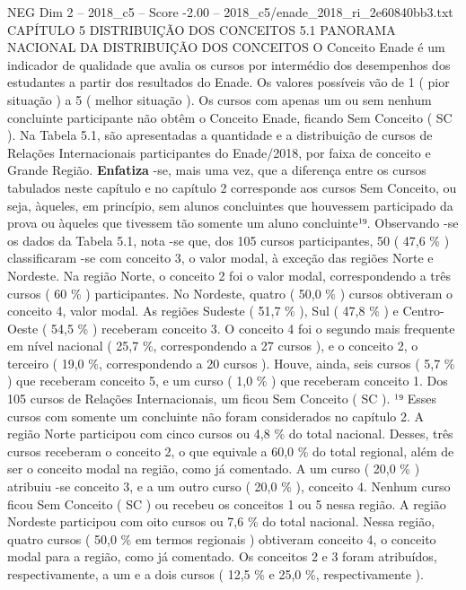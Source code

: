 \begin{textsample}{NEG Dim 2 – 2018\_c5 – Score -2.00 – 2018\_c5/enade\_2018\_ri\_2e60840bb3.txt}  \label{ex:f2_neg_118}
CAPÍTULO 5 DISTRIBUIÇÃO DOS CONCEITOS 5.1 PANORAMA NACIONAL DA DISTRIBUIÇÃO DOS CONCEITOS O Conceito Enade é um indicador de qualidade que avalia os cursos por intermédio dos desempenhos dos estudantes a partir dos resultados do Enade.
Os valores possíveis vão de 1 ( pior situação ) a 5 ( melhor situação ).
Os cursos com apenas um ou sem nenhum concluinte participante não obtêm o Conceito Enade, ficando Sem Conceito ( SC ).
Na Tabela 5.1, são apresentadas a quantidade e a distribuição de cursos de Relações Internacionais participantes do Enade/2018, por faixa de conceito e Grande Região. \textbf{Enfatiza} -se, mais uma vez, que a diferença entre os cursos tabulados neste capítulo e no capítulo 2 corresponde aos cursos Sem Conceito, ou seja, àqueles, em princípio, sem alunos concluintes que houvessem participado da prova ou àqueles que tivessem tão somente um aluno concluinte¹⁹.
Observando -se os dados da Tabela 5.1, nota -se que, dos 105 cursos participantes, 50 ( 47,6 \% ) classificaram -se com conceito 3, o valor modal, à exceção das regiões Norte e Nordeste.
Na região Norte, o conceito 2 foi o valor modal, correspondendo a três cursos ( 60 \% ) participantes.
No Nordeste, quatro ( 50,0 \% ) cursos obtiveram o conceito 4, valor modal.
As regiões Sudeste ( 51,7 \% ), Sul ( 47,8 \% ) e Centro-Oeste ( 54,5 \% ) receberam conceito 3.
O conceito 4 foi o segundo mais frequente em nível nacional ( 25,7 \%, correspondendo a 27 cursos ), e o conceito 2, o terceiro ( 19,0 \%, correspondendo a 20 cursos ).
Houve, ainda, seis cursos ( 5,7 \% ) que receberam conceito 5, e um curso ( 1,0 \% ) que receberam conceito 1.
Dos 105 cursos de Relações Internacionais, um ficou Sem Conceito ( SC ). ¹⁹ Esses cursos com somente um concluinte não foram considerados no capítulo 2.
A região Norte participou com cinco cursos ou 4,8 \% do total nacional.
Desses, três cursos receberam o conceito 2, o que equivale a 60,0 \% do total regional, além de ser o conceito modal na região, como já comentado.
A um curso ( 20,0 \% ) atribuiu -se conceito 3, e a um outro curso ( 20,0 \% ), conceito 4.
Nenhum curso ficou Sem Conceito ( SC ) ou recebeu os conceitos 1 ou 5 nessa região.
A região Nordeste participou com oito cursos ou 7,6 \% do total nacional.
Nessa região, quatro cursos ( 50,0 \% em termos regionais ) obtiveram conceito 4, o conceito modal para a região, como já comentado.
Os conceitos 2 e 3 foram atribuídos, respectivamente, a um e a dois cursos ( 12,5 \% e 25,0 \%, respectivamente ).

\end{textsample}
